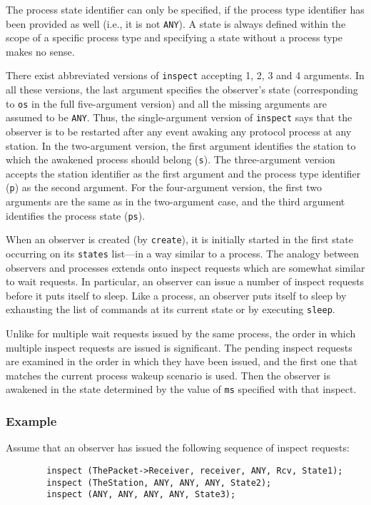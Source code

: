 The process state identifier can only be specified, if the process type
identifier has been provided as well (i.e., it is not {\tt ANY}).
A state is always defined within the scope of a specific process type and
specifying a state without a process type makes no sense.

There exist abbreviated versions of {\tt inspect}
accepting 1, 2, 3 and 4 arguments.
In all these versions, the last argument
specifies the observer's state
(corresponding to {\tt os} in the full five-argument version) and all the
missing arguments are assumed to be {\tt ANY}.
Thus, the single-argument version of {\tt inspect} says that the observer
is to be restarted after any event awaking any protocol process at any
station.
In the two-argument version, the first argument identifies the station to
which the awakened process should belong ({\tt s}).
The three-argument version accepts the station identifier as the first
argument and the process type identifier ({\tt p}) as the second argument.
For the four-argument version, the first two arguments are the same
as in the two-argument case, and the third argument identifies the process
state ({\tt ps}).

When an observer is created (by {\tt create}), it is initially
started in the first state occurring on its {\tt states} list---in
a way similar to a process.
The analogy between observers and processes extends
onto inspect requests which are somewhat similar to wait requests.
In particular, an observer can issue a number of inspect requests before
it puts itself to sleep.
Like a process, an observer puts itself to sleep by exhausting
the list of commands at its current state or by executing {\tt sleep}.

Unlike for multiple wait requests issued by the same process,
the order in which multiple inspect requests are issued is
significant.
The pending inspect requests are examined in the order in which they have
been issued, and
the first one that matches the current process wakeup scenario is used.
Then the observer is awakened in the state determined by the
value of {\tt ms} specified with that inspect.

\subsubsection*{Example}

\noindent
Assume that an observer has issued the following
sequence of inspect requests:
\begin{verbatim}
        inspect (ThePacket->Receiver, receiver, ANY, Rcv, State1);
        inspect (TheStation, ANY, ANY, ANY, State2);
        inspect (ANY, ANY, ANY, ANY, State3);
\end{verbatim}

